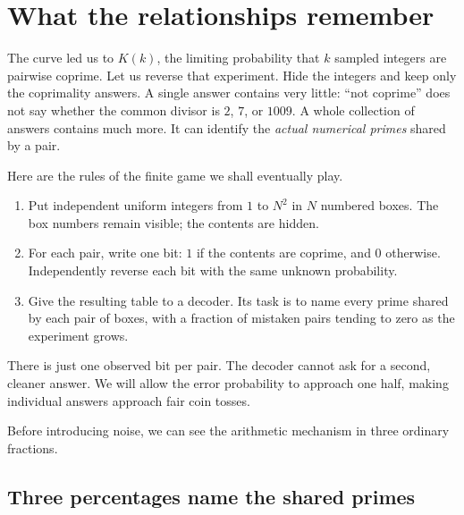 \section{What the relationships remember}\label{rec:relationships}

The curve led us to $K(k)$, the limiting probability that $k$ sampled
integers are pairwise coprime. Let us reverse that experiment. Hide the
integers and keep only the coprimality answers. A single answer contains
very little: ``not coprime'' does not say whether the common divisor is
$2$, $7$, or $1009$. A whole collection of answers contains much more.
It can identify the \emph{actual numerical primes} shared by a pair.

Here are the rules of the finite game we shall eventually play.
\begin{enumerate}
 \item Put independent uniform integers from $1$ to $N^2$ in $N$
 numbered boxes. The box numbers remain visible; the contents are hidden.
 \item For each pair, write one bit: $1$ if the contents are coprime,
 and $0$ otherwise. Independently reverse each bit with the same unknown
 probability.
 \item Give the resulting table to a decoder. Its task is to name every
 prime shared by each pair of boxes, with a fraction of mistaken pairs
 tending to zero as the experiment grows.
\end{enumerate}
There is just one observed bit per pair. The decoder cannot ask for a
second, cleaner answer. We will allow the error probability to approach
one half, making individual answers approach fair coin tosses.

Before introducing noise, we can see the arithmetic mechanism in three
ordinary fractions.

\subsection{Three percentages name the shared primes}

